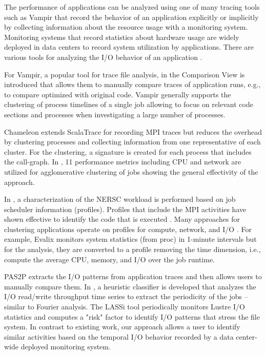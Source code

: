 \documentclass{jhps}
\begin{document}

The performance of applications can be analyzed using one of many tracing tools such as Vampir \cite{weber2017visual} that record the behavior of an application explicitly or implicitly by collecting information about the resource usage with a monitoring system.
Monitoring systems that record statistics about hardware usage are widely deployed in data centers to record system utilization by applications.
There are various tools for analyzing the I/O behavior of an application \cite{TFAPIKBBCF19}.

For Vampir, a popular tool for trace file analysis, in \cite{weber2017visual} the Comparison View is introduced that allows them to manually compare traces of application runs, e.g., to compare optimized with original code.
Vampir generally supports the clustering of process timelines of a single job allowing to focus on relevant code sections and processes when investigating a large number of processes.

Chameleon \cite{bahmani2018chameleon} extends ScalaTrace for recording MPI traces but reduces the overhead by clustering processes and collecting information from one representative of each cluster.
For the clustering, a signature is created for each process that includes the call-graph.
In \cite{halawa2020unsupervised}, 11 performance metrics including CPU and network are utilized for agglomerative clustering of jobs showing the general effectivity of the approach.

In \cite{rodrigo2018towards}, a characterization of the NERSC workload is performed based on job scheduler information (profiles).
Profiles that include the MPI activities have shown effective to identify the code that is executed \cite{demasi2013identifying}.
Many approaches for clustering applications operate on profiles for compute, network, and I/O \cite{emeras2015evalix,liu2020characterization,bang2020hpc}.
For example, Evalix \cite{emeras2015evalix} monitors system statistics (from proc) in 1-minute intervals but for the analysis, they are converted to a profile removing the time dimension, i.e., compute the average CPU, memory, and I/O over the job runtime.

PAS2P \cite{mendez2012new} extracts the I/O patterns from application traces and then allows users to manually compare them.
In \cite{white2018automatic}, a heuristic classifier is developed that analyzes the I/O read/write throughput time series to extract the periodicity of the jobs -- similar to Fourier analysis.
The LASSi tool \cite{AOPIUOTUNS19} periodically monitors Lustre I/O statistics and computes a "risk" factor to identify I/O patterns that stress the file system.
In contrast to existing work, our approach allows a user to identify similar activities based on the temporal I/O behavior recorded by a data center-wide deployed monitoring system.
\end{document}
